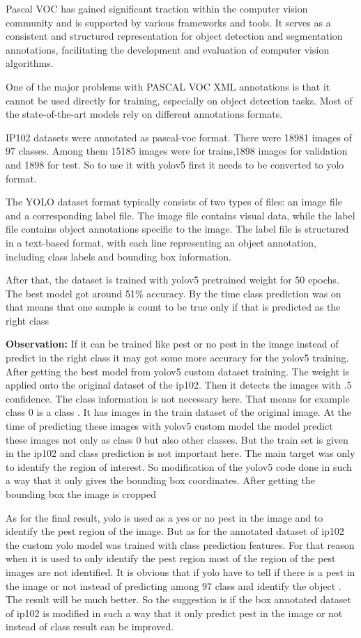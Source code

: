 Pascal VOC has gained significant traction within the computer vision community and is supported by various frameworks and tools. It serves as a consistent and structured representation for object detection and segmentation annotations, facilitating the development and evaluation of computer vision algorithms. 

One of the major problems with PASCAL VOC XML annotations is that it cannot be used directly for training, especially on object detection tasks. Most of the state-of-the-art models rely on different annotations formats.

IP102 datasets were annotated as pascal-voc format. There were 18981 images of 97 classes. Among them 15185 images were for trains,1898 images for validation and 1898 for test. So to use it with yolov5 first it needs to be converted to yolo format.

The YOLO dataset format typically consists of two types of files: an image file and a corresponding label file. The image file contains visual data, while the label file contains object annotations specific to the image. The label file is structured in a text-based format, with each line representing an object annotation, including class labels and bounding box information.

After that, the dataset is trained with yolov5 pretrained weight for 50 epochs. The best model got around 51\% accuracy. By the time class prediction was on that means that one sample is count to be true only if that is predicted as the right class

\textbf{Observation:} If it can be trained like pest or no pest in the image instead of predict in the right class it may got some more accuracy for the yolov5 training. After getting the best model from yolov5 custom dataset training. The weight is applied onto the original dataset of the ip102. Then it detects the images with .5 confidence. The class information is not necessary here. That means for example class 0 is a class . It has images in the train dataset of the original image. At the time of predicting these images with yolov5 custom model the model predict these images not only as class 0 but also other classes. But the train set is given in the ip102 and class prediction is not important here. The main target was only to identify the region of interest. So modification of the yolov5 code done in such a way that it only gives the bounding box coordinates. After getting the bounding box the image is cropped

As for the final result, yolo is used as a yes or no pest in the image and to identify the pest region of the image. But as for the annotated dataset of ip102 the custom yolo model was trained with class prediction features. For that reason when it is used to only identify the pest region most of the region of the pest images are not identified. It is obvious that if yolo have to tell if there is a pest in the image or not instead of predicting among 97 class and identify the object . The result will be much better. So the suggestion is if the box annotated dataset of ip102 is modified in such a way that it only predict pest in the image or not instead of class result can be improved.


